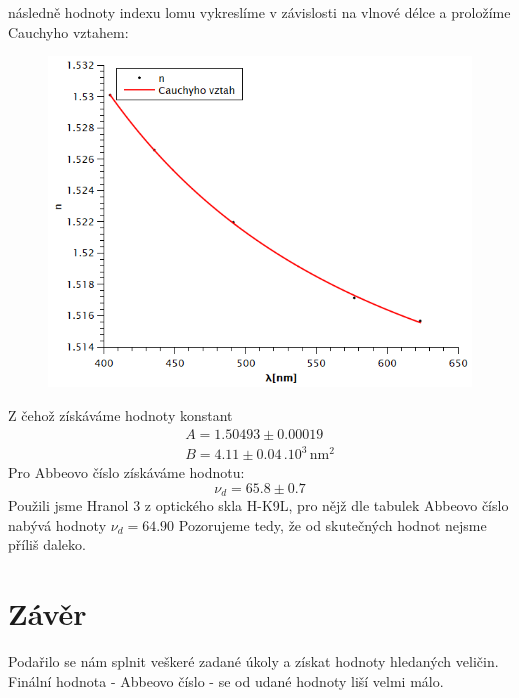 \documentclass[czech,11pt,a4paper]{article}
\begin{document}
\begin{multicols}{2}
		
		
		následně hodnoty indexu lomu vykreslíme v závislosti na vlnové délce a proložíme Cauchyho vztahem:
		
		\begin{figure}[H]
			\includegraphics[width=0.95\linewidth,center]{fit}
		\end{figure}
		Z čehož získáváme hodnoty konstant
		\begin{gather*}
			A = 1.50493 \pm 0.00019 \\
			B = 4.11 \pm 0.04 \,.10^3 \,\mathrm{nm^2}
		\end{gather*}
		Pro Abbeovo číslo získáváme hodnotu:
		\begin{equation*}
			\nu_d = 65.8 \pm 0.7
		\end{equation*}
		Použili jsme Hranol 3 z optického skla H-K9L, pro nějž dle tabulek Abbeovo číslo nabývá hodnoty $\nu _d = 64.90$ Pozorujeme tedy, že od skutečných hodnot nejsme příliš daleko.
		
		\section{Závěr}
		Podařilo se nám splnit veškeré zadané úkoly a získat hodnoty hledaných veličin. Finální hodnota - Abbeovo číslo - se od udané hodnoty liší velmi málo.
		
	
		

		
		
		
		
		
	\end{multicols}
\end{document}
